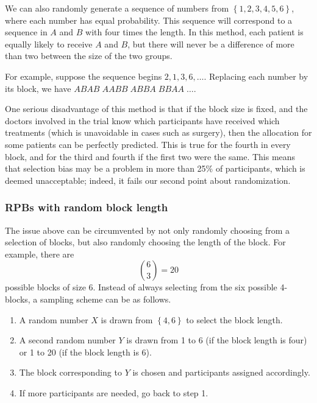 \documentclass[
  openany]{book}
\providecommand{\tightlist}{%
  \setlength{\itemsep}{0pt}\setlength{\parskip}{0pt}}
\theoremstyle{definition}
\theoremstyle{definition}
\theoremstyle{definition}
\theoremstyle{definition}
\theoremstyle{remark}
\begin{document}
We can also randomly generate a sequence of numbers from \(\left\lbrace 1, 2, 3, 4, 5, 6 \right\rbrace\), where each number has equal probability. This sequence will correspond to a sequence in \(A\) and \(B\) with four times the length. In this method, each patient is equally likely to receive \(A\) and \(B\), but there will never be a difference of more than two between the size of the two groups.

For example, suppose the sequence begins \(2,1,3,6,\ldots\). Replacing each number by its block, we have \(ABAB\;AABB\;ABBA\;BBAA\;\ldots\).

One serious disadvantage of this method is that if the block size is fixed, and the doctors involved in the trial know which participants have received which treatments (which is unavoidable in cases such as surgery), then the allocation for some patients can be perfectly predicted. This is true for the fourth in every block, and for the third and fourth if the first two were the same. This means that selection bias may be a problem in more than 25\% of participants, which is deemed unacceptable; indeed, it fails our second point about randomization.

\hypertarget{rpbs-with-random-block-length}{%
\subsubsection{RPBs with random block length}\label{rpbs-with-random-block-length}}

The issue above can be circumvented by not only randomly choosing from a selection of blocks, but also randomly choosing the length of the block. For example, there are
\[ \binom{6}{3} = 20\]
possible blocks of size 6. Instead of always selecting from the six possible 4-blocks, a sampling scheme can be as follows.

\begin{enumerate}
\def\labelenumi{\arabic{enumi}.}
\tightlist
\item
  A random number \(X\) is drawn from \(\left\lbrace 4,6\right\rbrace\) to select the block length.
\item
  A second random number \(Y\) is drawn from 1 to 6 (if the block length is four) or 1 to 20 (if the block length is 6).
\item
  The block corresponding to \(Y\) is chosen and participants assigned accordingly.
\item
  If more participants are needed, go back to step 1.
\end{enumerate}
\end{document}
